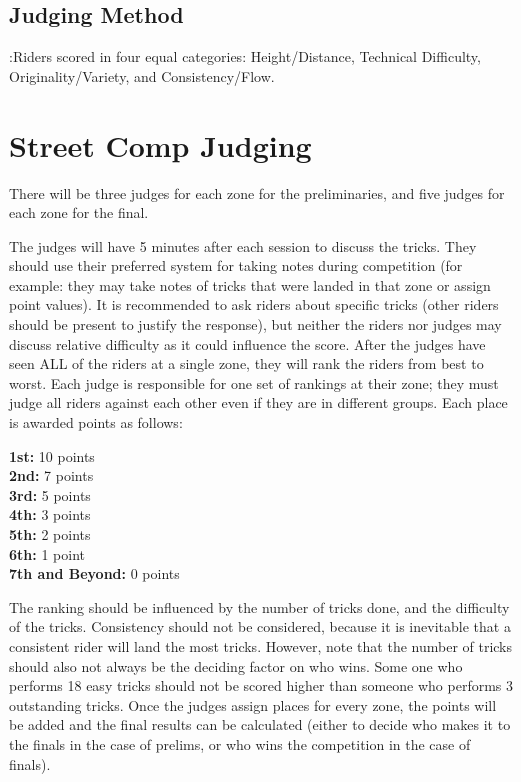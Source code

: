\subsection{Judging Method}:Riders scored in four equal categories: Height/Distance, Technical Difficulty, Originality/Variety, and Consistency/Flow.

\section{Street Comp Judging}
There will be three judges for each zone for the preliminaries, and five judges for each zone for the final.

The judges will have 5 minutes after each session to discuss the tricks.
They should use their preferred system for taking notes during competition (for example: they may take notes of tricks that were landed in that zone or assign point values).
It is recommended to ask riders about specific tricks (other riders should be present to justify the response), but neither the riders nor judges may discuss relative difficulty as it could influence the score.
After the judges have seen ALL of the riders at a single zone, they will rank the riders from best to worst.
Each judge is responsible for one set of rankings at their zone; they must judge all riders against each other even if they are in different groups.
Each place is awarded points as follows:

\textbf{1st:} 10 points\\
\textbf{2nd:} 7 points\\
\textbf{3rd:} 5 points\\
\textbf{4th:} 3 points\\
\textbf{5th:} 2 points\\
\textbf{6th:} 1 point\\ 
\textbf{7th and Beyond:} 0 points

The ranking should be influenced by the number of tricks done, and the difficulty of the tricks.
Consistency should not be considered, because it is inevitable that a consistent rider will land the most tricks.
However, note that the number of tricks
should also not always be the deciding factor on who wins.
Some one who performs 18 easy tricks should not be scored higher than someone who performs 3 outstanding tricks.
Once the judges assign places for every zone, the points will be added and the final results can be calculated (either to decide who makes it to the finals in the case of prelims, or who wins the competition in the case of finals).